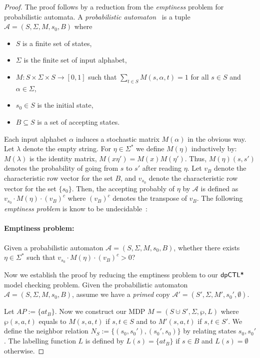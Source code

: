 \begin{proof}
The proof follows by a reduction from the \emph{emptiness} problem for probabilistic automata.
A \emph{probabilistic automaton}~\cite{Rabin63} is a tuple $\mathcal{A}= (S,\Sigma,M,s_0,B)$ where
\begin{itemize}
  \item $S$ is a finite set of states,
  \item $\Sigma$ is the finite set of input alphabet,
  \item $M: S\times\Sigma\times S \to [0,1]$ such that $\sum_{t\in S} M(s,\alpha,t)=1$ for all $s\in S$ and $\alpha\in \Sigma$,
  \item $s_0\in S$ is the initial state,
  \item $B\subseteq S$ is a set of accepting states.
\end{itemize}

Each input alphabet $\alpha$ induces a stochastic matrix $M(\alpha)$ in the obvious way. Let $\lambda$ denote the empty string. For $\eta\in\Sigma^*$ we define $M(\eta)$ inductively by: $M(\lambda)$ is the identity matrix, $M(x\eta')=M(x)M(\eta')$. Thus, $M(\eta)(s,s')$ denotes the probability of going from $s$ to $s'$ after reading $\eta$. Let $v_B$ denote the characteristic row vector for the set $B$, and $v_{s_0}$ denote the characteristic row vector for the set $\{s_0\}$. Then, the accepting probably of $\eta$ by $\mathcal{A}$ is defined as $v_{s_0}\cdot M(\eta)\cdot (v_B)^c$ where $(v_B)^c$ denotes the transpose of $v_B$. The following \emph{emptiness problem} is know to be undecidable~\cite{Paz71}:

\paragraph{Emptiness problem:} Given a probabilistic automaton $\mathcal{A}= (S,\Sigma,M,s_0,B)$, whether there exists $\eta\in\Sigma^*$ such that $v_{s_0}\cdot M(\eta)\cdot (v_B)^c > 0$?

Now we establish the proof by reducing the emptiness problem to our $\textsf{dpCTL*}$ model checking problem. Given the probabilistic automaton  $\mathcal{A}= (S,\Sigma,M,s_0,B)$, assume we have a \emph{primed} copy $\mathcal{A}'= (S',\Sigma,M',s_0',\emptyset)$.

Let $AP:=\{at_B\}$. Now we construct our MDP  $M =
(S\cupdot S', \Sigma, \wp, L)$ where $\wp(s,a,t)$ equals to $M(s,a,t)$ if $s,t\in S$ and to $M'(s,a,t)$ if $s,t\in S'$. We define the neighbor relation $N_S:=\{(s_0,s_0'),(s_0',s_0)\}$ by relating states $s_0,s_0'$. The labelling function $L$ is defined by $L(s)=\{at_B\}$ if $s\in B$ and $L(s)=\emptyset$ otherwise.


\end{proof}

